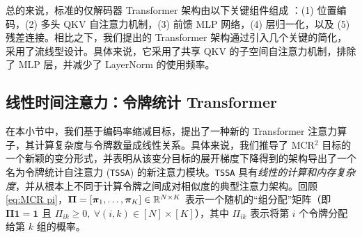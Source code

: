 \documentclass[../../book-main.tex]{subfiles}
\begin{document}
总的来说，标准的仅解码器 Transformer 架构由以下关键组件组成 \cite{vaswani2017attention}：(1) 位置编码，(2) 多头 QKV 自注意力机制，(3) 前馈 MLP 网络，(4) 层归一化，以及 (5) 残差连接。相比之下，我们提出的 Transformer 架构通过引入几个关键的简化，采用了流线型设计。具体来说，它采用了共享 QKV 的子空间自注意力机制，排除了 MLP 层，并减少了 LayerNorm 的使用频率。










\subsection{线性时间注意力：令牌统计 Transformer}\label{sub:tost}

在本小节中，我们基于编码率缩减目标，提出了一种新的 Transformer 注意力算子，其计算复杂度与令牌数量成线性关系。具体来说，我们推导了 MCR$^2$ 目标的一个新颖的变分形式，并表明从该变分目标的展开梯度下降得到的架构导出了一个名为令牌统计自注意力 (\texttt{TSSA}) 的新注意力模块。\texttt{TSSA} 具有{\em 线性的计算和内存复杂度}，并从根本上不同于计算令牌之间成对相似度的典型注意力架构。回顾 \eqref{eq:MCR pi}，$\bm \Pi = [\bm \pi_1, \ldots, \bm \pi_K] \in \mathbb{R}^{N \times K}$ 表示一个随机的“组分配”矩阵（即 $\bm \Pi \bm 1 = \bm 1$ 且 $\Pi_{ik} \geq 0, \  \forall (i,k) \in [N] \times [K]$），其中 $\Pi_{ik}$ 表示将第 $i$ 个令牌分配给第 $k$ 组的概率。

\end{document}
